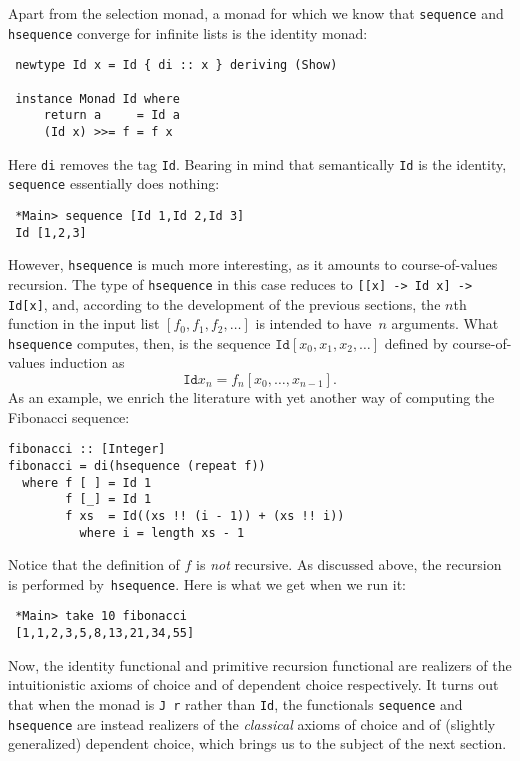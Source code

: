 Apart from the selection monad, a monad for which we know that
\verb+sequence+ and \verb+hsequence+ converge for infinite lists is
the identity monad:
\begin{verbatim}
 newtype Id x = Id { di :: x } deriving (Show)
  
 instance Monad Id where
     return a     = Id a   
     (Id x) >>= f = f x
\end{verbatim}
Here \verb+di+ removes the tag \verb+Id+.  Bearing in mind that
semantically \verb+Id+ is the identity, \verb+sequence+ essentially
does nothing:
\begin{verbatim}
 *Main> sequence [Id 1,Id 2,Id 3]
 Id [1,2,3]
\end{verbatim}
However, \verb+hsequence+ is much more interesting, as it amounts to
course-of-values recursion. The type of \verb+hsequence+ in this case
reduces to \verb+[[x] -> Id x] -> Id[x]+, and, according to the
development of the previous sections, the $n$th function in the input
list $[f_0,f_1,f_2,\dots]$ is intended to have~$n$ arguments. What
\verb+hsequence+ computes, then, is the sequence $\mathtt{Id}[x_0,x_1,x_2,\dots]$
defined by course-of-values induction as
\[
\mathtt{Id} x_{n} = f_n[x_0,\dots,x_{n-1}].
\]
As an example, we enrich the literature
with yet another way of computing the Fibonacci sequence:
\begin{verbatim}
fibonacci :: [Integer]
fibonacci = di(hsequence (repeat f))
  where f [ ] = Id 1
        f [_] = Id 1
        f xs  = Id((xs !! (i - 1)) + (xs !! i))
          where i = length xs - 1
\end{verbatim}
Notice that the definition of $f$ is \emph{not} recursive. As
discussed above, the recursion is performed by~\verb+hsequence+.  Here
is what we get when we run it:
\begin{verbatim}
 *Main> take 10 fibonacci
 [1,1,2,3,5,8,13,21,34,55]
\end{verbatim}

Now, the identity functional and primitive recursion functional are
realizers of the intuitionistic axioms of choice and of dependent
choice respectively.  It turns out that when the monad is \verb+J r+
rather than \verb+Id+, the functionals \verb+sequence+ and
\verb+hsequence+ are instead realizers of the \emph{classical} axioms
of choice and of (slightly generalized) dependent choice, which brings
us to the subject of the next section.


